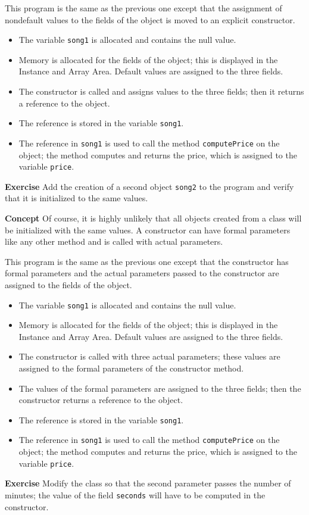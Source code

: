 This program is the same as the previous one except that the assignment of nondefault values to the fields of the object is moved to an explicit constructor.
\begin{itemize}
\item The variable \texttt{song1} is allocated and contains the null value.
\item Memory is allocated for the fields of the object; this is displayed in the Instance and Array Area. Default values are assigned to the three fields.
\item The constructor is called and assigns values to the three fields; 
then it returns a reference to the object.
\item The reference is stored in the variable \texttt{song1}.
\item The reference in \texttt{song1} is used to call the method \texttt{computePrice} on the object; the method computes and returns the price,
which is assigned to the variable \texttt{price}.
\end{itemize}

\textbf{Exercise} Add the creation of a second object \texttt{song2} to the
program and verify that it is initialized to the same values.

\bigskip

\textbf{Concept} Of course, it is highly unlikely that all objects created from a class will be initialized with the same values. A constructor can have formal parameters like any other method and is called with actual parameters.


This program is the same as the previous one except that the constructor has formal parameters and the actual parameters passed to the constructor are assigned to the fields of the object.
\begin{itemize}
\item The variable \texttt{song1} is allocated and contains the null value.
\item Memory is allocated for the fields of the object; this is displayed in the Instance and Array Area. Default values are assigned to the three fields.
\item The constructor is called with three actual parameters; these values are assigned to the formal parameters of the constructor method.
\item The values of the formal parameters are assigned to the three fields; then the constructor returns a reference to the object.
\item The reference is stored in the variable \texttt{song1}.
\item The reference in \texttt{song1} is used to call the method \texttt{computePrice} on the object; the method computes and returns the price,
which is assigned to the variable \texttt{price}.
\end{itemize}

\textbf{Exercise}  Modify the class so that the second parameter passes
the number of minutes; the value of the field \texttt{seconds} will have
to be computed in the constructor.
